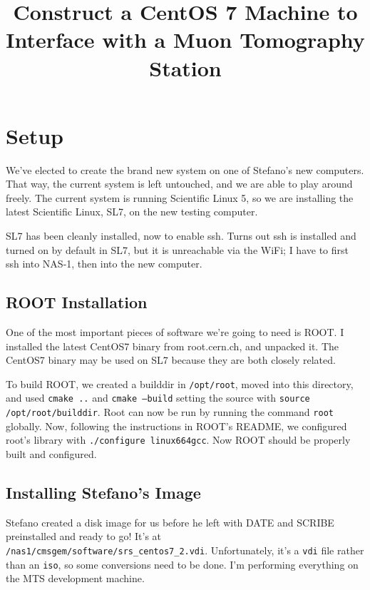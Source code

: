 \documentclass[12pt]{article}
\begin{document}

\title{Construct a CentOS 7 Machine to Interface with a Muon Tomography Station}

\maketitle 




\section{Setup}

\qq We've elected to create the brand new system on one of Stefano's new
computers. That way, the current system is left untouched, and we are able to
play around freely. The current system is running Scientific Linux 5, so we are
installing the latest Scientific Linux, SL7, on the new testing computer. 

\qq SL7 has been cleanly installed, now to enable ssh. Turns out ssh is
installed and turned on by default in SL7, but it is unreachable via the WiFi; I
have to first ssh into NAS-1, then into the new computer.

\subsection{ROOT Installation}

\qq One of the most important pieces of software we're going to need is ROOT. I
installed the latest CentOS7 binary from root.cern.ch, and unpacked it. The
CentOS7 binary may be used on SL7 because they are both closely related.

\qq To build ROOT, we created a builddir in {\tt /opt/root}, moved into this directory, and used {\tt cmake ..} and {\tt cmake --build} setting the source with {\tt source /opt/root/builddir}. Root can now be run by running the command {\tt root} globally. Now, following the instructions in ROOT's README, we configured root's library with {\tt ./configure linux664gcc}. Now ROOT should be properly built and configured.

\subsection{Installing Stefano's Image}

\qq Stefano created a disk image for us before he left with DATE and SCRIBE
preinstalled and ready to go! It's at {\tt
  /nas1/cmsgem/software/srs\_centos7\_2.vdi}. Unfortunately, it's a {\tt vdi} file
rather than an {\tt iso}, so some conversions need to be done. I'm performing
everything on the MTS development machine.
\end{document}
